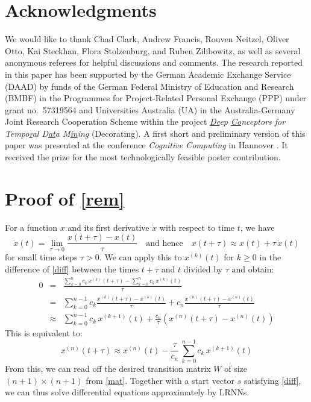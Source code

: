 \documentclass[preprint,12pt,times,authoryear]{elsarticle}%
\theoremstyle{definition}
\begin{document}
\section*{Acknowledgments}

We would like to thank Chad Clark, Andrew Francis, Rouven Neitzel, Oliver Otto,
Kai Steckhan, Flora Stolzenburg, and Ruben Zilibowitz, as well as several
anonymous referees for helpful discussions
and comments. The research reported in this paper has been supported by the
German Academic Exchange Service (DAAD) by funds of the German Federal Ministry
of Education and Research (BMBF) in the Programmes for Project-Related Personal
Exchange (PPP) under grant no.~57319564 and Universities Australia (UA) in the
Australia-Germany Joint Research Cooperation Scheme within the project
\emph{\underline{De}ep \underline{Co}nceptors for Tempo\underline{r}al
D\underline{at}a M\underline{in}in\underline{g}} (Decorating).
A first short and preliminary version of this paper was presented at the conference
\emph{Cognitive Computing} in Hannover \citep{SMO18}. It received the prize for the
most technologically feasible poster contribution.




\appendix

\section{Proof of \cref{rem}}\label{proof:rem}

\noindent For a function $x$ and its first derivative $\dot{x}$ with
respect to time $t$, we have
\[
  \dot{x}(t) = \lim\limits_{\tau \to 0} \frac{x(t+\tau)-x(t)}{\tau}
	\quad\text{and hence}\quad
  x(t+\tau) \approx x(t) + \tau\,\dot{x}(t)
\]
for small time steps $\tau>0$. We can apply this to $x^{(k)}(t)$ for $k \ge 0$
in the difference of \cref{diff} between the times $t+\tau$ and $t$ divided by
$\tau$ and obtain:
\begin{eqnarray*}
  0 & = & \frac{\displaystyle\sum_{k=0}^n c_k\,x^{(k)}(t+\tau)-\sum_{k=0}^n c_k\,x^{(k)}(t)}{\tau}\\
    & = & \sum_{k=0}^{n-1} c_k \frac{x^{(k)}(t+\tau)-x^{(k)}(t)}{\tau} + c_n \frac{x^{(n)}(t+\tau)-x^{(n)}(t)}{\tau}\\
    & \approx & \sum_{k=0}^{n-1} c_k\,x^{(k+1)}(t) + \frac{c_n}{\tau} \left(x^{(n)}(t+\tau)-x^{(n)}(t)\right)
\end{eqnarray*}
This is equivalent to:
\[
	x^{(n)}(t+\tau)
	\approx x^{(n)}(t) - \frac{\tau}{c_n}\,\sum_{k=0}^{n-1} c_k\,x^{(k+1)}(t)
\]
From this, we can read off the desired transition matrix $W$ of size $(n+1) \times (n+1)$ from \cref{mat}.
Together with a start vector $s$ satisfying \cref{diff}, we can thus solve
differential equations approximately by LRNNs.
\end{document}
